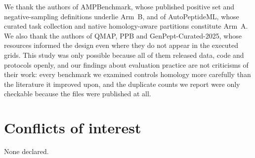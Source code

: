 \documentclass[11pt,a4paper]{article}
\begin{document}
We thank the authors of AMPBenchmark, whose published positive set and negative-sampling
definitions underlie Arm~B, and of AutoPeptideML, whose curated task collection and native
homology-aware partitions constitute Arm~A. We also thank the authors of QMAP, PPB and
GenPept-Curated-2025, whose resources informed the design even where they do not appear in
the executed grids. This study was only possible because all of them released data, code
and protocols openly, and our findings about evaluation practice are not criticisms of
their work: every benchmark we examined controls homology more carefully than the
literature it improved upon, and the duplicate counts we report were only checkable
because the files were published at all.

\section*{Conflicts of interest}
None declared.
\end{document}
